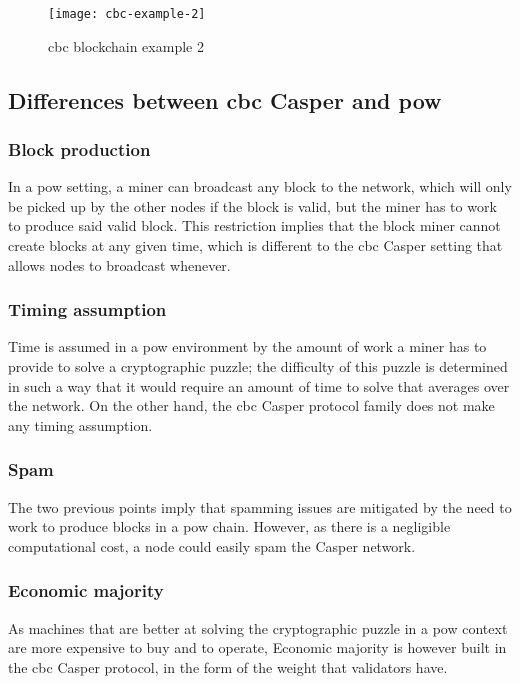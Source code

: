 \begin{figure}[h]
	\centering
	\texttt{[image: cbc-example-2]}
    \caption{\gls{cbc} blockchain example 2 }
	\label{fig:example2}
\end{figure}

\FloatBarrier
\subsection{Differences between \gls{cbc} Casper and \gls{pow}}
\label{ssec:powVsPos}

\subsubsection{Block production}
In a \gls{pow}\cite{yellowpaper} setting, a miner can broadcast any block to the
network, which will only be picked up by the other nodes if the block is valid,
but the miner has to work to produce said valid block. This restriction implies
that the block miner cannot create blocks at any given time, which is different
to the \gls{cbc} Casper setting that allows nodes to broadcast whenever. 

\subsubsection{Timing assumption}
Time is assumed in a \gls{pow} environment by the amount of work a miner has to
provide to solve a cryptographic puzzle; the difficulty of this puzzle is
determined in such a way that it would require an amount of time to solve that
averages over the network. On the other hand, the \gls{cbc} Casper protocol
family does not make any timing assumption.

\subsubsection{Spam}
The two previous points imply that spamming issues are mitigated by the need to
work to produce blocks in a \gls{pow} chain. However, as there is a negligible
computational cost, a node could easily spam the Casper network.

\subsubsection{Economic majority}
As machines that are better at solving the cryptographic puzzle in a \gls{pow}
context are more expensive to buy and to operate, 
Economic majority is however built in the \gls{cbc} Casper protocol, in the form
of the weight that validators have.

